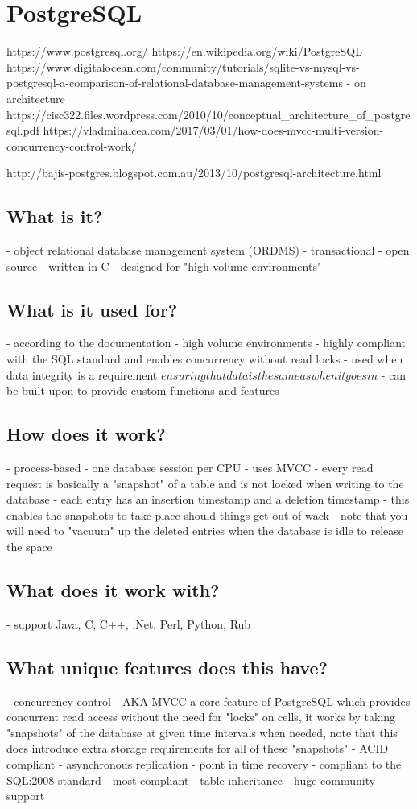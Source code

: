 \chapter{PostgreSQL}
https://www.postgresql.org/
https://en.wikipedia.org/wiki/PostgreSQL
https://www.digitalocean.com/community/tutorials/sqlite-vs-mysql-vs-postgresql-a-comparison-of-relational-database-management-systems
- on architecture
https://cisc322.files.wordpress.com/2010/10/conceptual_architecture_of_postgresql.pdf
https://vladmihalcea.com/2017/03/01/how-does-mvcc-multi-version-concurrency-control-work/

http://bajis-postgres.blogspot.com.au/2013/10/postgresql-architecture.html

\section{What is it?}
- object relational database management system (ORDMS)
- transactional
- open source
- written in C
- designed for "high volume environments"

\section{What is it used for?}
- according to the documentation - high volume environments
- highly compliant with the SQL standard and enables concurrency without read locks
- used when data integrity is a requirement \(ensuring that data is the same as when it goes in\)
- can be built upon to provide custom functions and features

\section{How does it work?}
- process-based - one database session per CPU
- uses MVCC - every read request is basically a "snapshot" of a table and is not locked when writing to the database
- each entry has an insertion timestamp and a deletion timestamp - this enables the snapshots to take place should things get out of wack
- note that you will need to "vacuum" up the deleted entries when the database is idle to release the space

\section{What does it work with?}
- support Java, C, C++, .Net, Perl, Python, Rub

\section{What unique features does this have?}
- concurrency control - AKA MVCC a core feature of PostgreSQL which provides concurrent read access without the need for "locks" on cells, it works by taking "snapshots" of the database at given time intervals when needed, note that this does introduce extra storage requirements for all of these "snapshots"
- ACID compliant
- asynchronous replication
- point in time recovery
- compliant to the SQL:2008 standard - most compliant
- table inheritance
- huge community support


